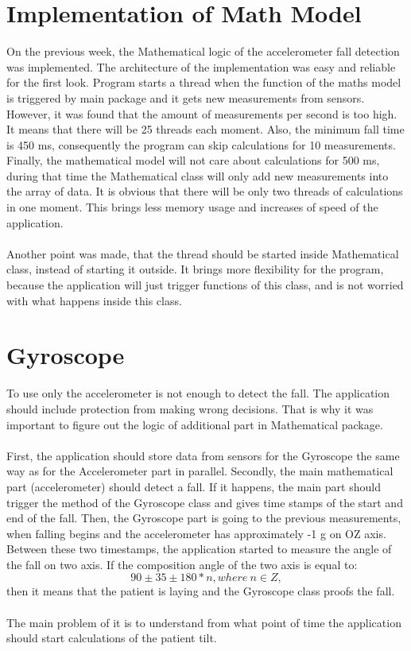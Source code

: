 \documentclass[conference,12pt]{IEEETran}
\begin{document}
\section{Implementation of Math Model}
On the previous week, the Mathematical logic of the accelerometer fall detection was implemented. The architecture of the implementation was easy and reliable for the first look. Program starts a thread when the function of the maths model is triggered by main package and it gets new measurements from sensors. However, it was found that the amount of measurements per second is too high. It means that there will be 25 threads each moment. Also, the minimum fall time is 450 ms, consequently the program can skip calculations for 10 measurements. Finally, the mathematical model will not care about calculations for 500 ms, during that time the Mathematical class will only add new measurements into the array of data. It is obvious that there will be only two threads of calculations in one moment. This brings less memory usage and increases of speed of the application.\\\\
Another point was made, that the thread should be started inside Mathematical class, instead of starting it outside. It brings more flexibility for the program, because the application will just trigger functions of this class, and is not worried with what happens inside this class.

\section{Gyroscope}
To use only the accelerometer is not enough to detect the fall. The application should include protection from making wrong decisions. That is why it was important to figure out the logic of additional part in Mathematical package.\\\\
First, the application should store data from sensors for the Gyroscope the same way as for the Accelerometer part in parallel. Secondly, the main mathematical part (accelerometer) should detect a fall. If it happens, the main part should trigger the method of the Gyroscope class and gives time stamps of the start and end of the fall. Then, the Gyroscope part is going to the previous measurements, when falling begins and the accelerometer has approximately -1 g on OZ axis. Between these two timestamps, the application started to measure the angle of the fall on two axis. If the composition angle of the two axis is equal to: $$90 \pm 35 \pm 180 * n, where\ n \in Z,$$
then it means that the patient is laying and the Gyroscope class proofs the fall.\\\\
The main problem of it is to understand from what point of time the application should start calculations of the patient tilt.
\end{document}
